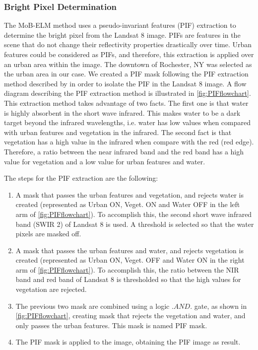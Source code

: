 \documentclass[onecolumn,3p]{elsarticle}
\begin{document}
\subsubsection{Bright Pixel Determination}

The MoB-ELM method uses a pseudo-invariant features (PIF) extraction to determine the bright pixel from the Landsat 8 image. PIFs are features in the scene that do not change their reflectivity properties drastically over time. Urban features could be considered as PIFs, and therefore, this extraction is applied over an urban area within the image. The downtown of Rochester, NY was selected as the urban area in our case. We created a PIF mask following the PIF extraction method described by \cite{Schott:1988} in order to isolate the PIF in the Landsat 8 image. A flow diagram describing the PIF extraction method is illustrated in \autoref{fig:PIFflowchart}. This extraction method takes advantage of two facts. The first one is that water is highly absorbent in the short wave infrared. This makes water to be a dark target beyond the infrared wavelengths, i.e. water has low values when compared with urban features and vegetation in the infrared. The second fact is that vegetation has a high value in the infrared when compare with the red (red edge). Therefore, a ratio between the near infrared band and the red band has a high value for vegetation and a low value for urban features and water. 

The steps for the PIF extraction are the following:
\begin{enumerate}\itemsep10pt
	\item A mask that passes the urban features and vegetation, and rejects water is created (represented as Urban ON, Veget. ON and Water OFF in the left arm of \autoref{fig:PIFflowchart}). To accomplish this, the second short wave infrared band (SWIR 2) of Landsat 8 is used. A threshold is selected so that the water pixels are masked off.
	\item A mask that passes the urban features and water, and rejects vegetation is created (represented as Urban ON, Veget. OFF and Water ON in the right arm of \autoref{fig:PIFflowchart}). To accomplish this, the ratio between the NIR band and red band of Landsat 8 is thresholded so that the high values for vegetation are rejected.
	\item The previous two mask are combined using a logic $.AND.$ gate, as shown in \autoref{fig:PIFflowchart}, creating mask that rejects the vegetation and water, and only passes the urban features. This mask is named PIF mask.
	\item The PIF mask is applied to the image, obtaining the PIF image as result.

\end{enumerate}
\end{document}
